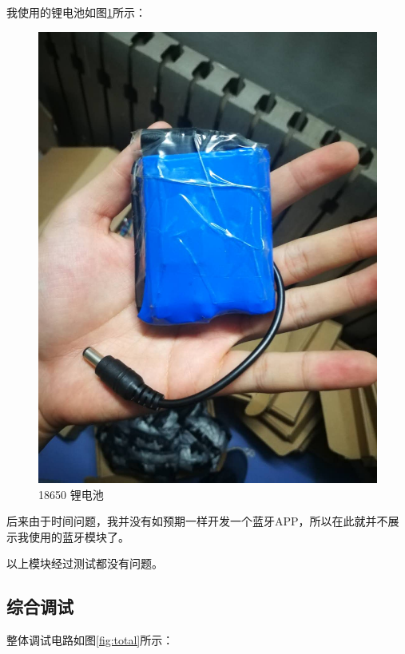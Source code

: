 \documentclass{article}
\begin{document}
\begin{spacing}{1.5}
\begin{enumerate}
    我使用的锂电池如图\ref{fig:module10}所示：
    \begin{figure}[H]
        \centering
        \includegraphics[scale=0.1]{fig/result/module10.png}
        \caption{18650 锂电池}
        \label{fig:module10}
    \end{figure}

    后来由于时间问题，我并没有如预期一样开发一个蓝牙APP，所以在此就并不展示我使用的蓝牙模块了。

    以上模块经过测试都没有问题。

\end{enumerate}

    \subsection{综合调试}

    整体调试电路如图\ref{fig:total}所示：


\end{spacing}
\end{document}

